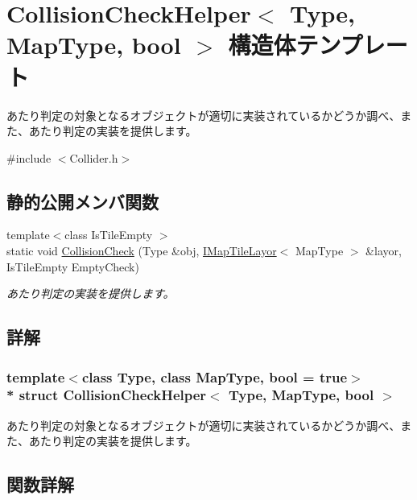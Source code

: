 \hypertarget{struct_collision_check_helper}{}\section{Collision\+Check\+Helper$<$ Type, Map\+Type, bool $>$ 構造体テンプレート}
\label{struct_collision_check_helper}


あたり判定の対象となるオブジェクトが適切に実装されているかどうか調べ、また、あたり判定の実装を提供します。 




{\ttfamily \#include $<$Collider.\+h$>$}

\subsection*{静的公開メンバ関数}
\begin{DoxyCompactItemize}
\item 
{\footnotesize template$<$class Is\+Tile\+Empty $>$ }\\static void \hyperlink{struct_collision_check_helper_a2a6b589d941c538897bef9de9301c0a0}{Collision\+Check} (Type \&obj, \hyperlink{class_i_map_tile_layor}{I\+Map\+Tile\+Layor}$<$ Map\+Type $>$ \&layor, Is\+Tile\+Empty Empty\+Check)
\begin{DoxyCompactList}\small\item\em あたり判定の実装を提供します。\end{DoxyCompactList}\end{DoxyCompactItemize}


\subsection{詳解}
\subsubsection*{template$<$class Type, class Map\+Type, bool = true$>$\\*
struct Collision\+Check\+Helper$<$ Type, Map\+Type, bool $>$}

あたり判定の対象となるオブジェクトが適切に実装されているかどうか調べ、また、あたり判定の実装を提供します。



\subsection{関数詳解}
